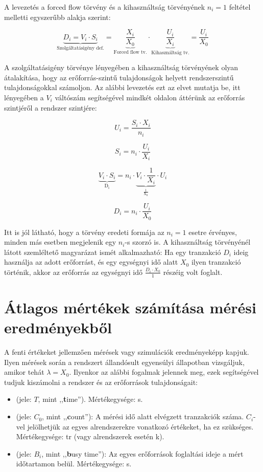 A levezetés a forced flow törvény és a kihasználtság törvényének $n_i = 1$ feltétel melletti egyszerűbb alakja szerint:

$$\underbrace{D_i = V_i \cdot S_i}_\textrm{Szolgáltatásigény def.} =
\underbrace{\frac{X_i}{X_0}}_\textrm{Forced flow tv.} \cdot
\underbrace{\frac{U_i}{X_i}}_\textrm{Kihasználtság tv.} = \frac{U_i}{X_0}$$

A szolgáltatásigény törvénye lényegében a kihasználtság törvényének olyan átalakítása, hogy az erőforrás-szintű tulajdonságok helyett rendszerszintű tulajdonságokkal számoljon. Az alábbi levezetés ezt az elvet mutatja be, itt lényegében a $V_i$ váltószám segítségével mindkét oldalon áttérünk az erőforrás szintjéről a rendszer szintjére:

$$U_i = \frac{S_i \cdot X_i}{n_i}$$

$$S_i = n_i \cdot \frac{U_i}{X_i}$$

$$\underbrace{V_i \cdot S_i}_\mathrm{D_i} = n_i \cdot \underbrace{V_i \cdot \frac{1}{X_i}}_\mathrm{\frac{1}{X_0}} \cdot U_i$$

$$D_i = n_i \cdot \frac{U_i}{X_0}$$

Itt is jól látható, hogy a törvény eredeti formája az $n_i = 1$ esetre érvényes, minden más esetben megjelenik egy $n_i$-s szorzó is. A kihasználtság törvényénél látott szemléltető magyarázat ismét alkalmazható: Ha egy tranzakció $D_i$ ideig használja az adott erőforrást, és egy egységnyi idő alatt $X_0$ ilyen tranzakció történik, akkor az erőforrás az egységnyi idő $\frac{D_i \cdot X_0}{1}$ részéig volt foglalt.

\section{Átlagos mértékek számítása mérési eredményekből }

A fenti értékeket jellemzően mérések vagy szimulációk eredményeképp kapjuk. Ilyen mérések során a rendszert állandósult egyensúlyi állapotban vizsgáljuk, amikor tehát $\lambda = X_0$. Ilyenkor az alábbi fogalmak jelennek meg, ezek segítségével tudjuk kiszámolni a rendszer és az erőforrások tulajdonságait:

\begin{definicio}
\begin{itemize}
	\item {} (jele: $T$, mint ,,\textbf{t}ime''). Mértékegysége: s.
	\item {} (jele: $C_0$, mint ,,\textbf{c}ount''): A mérési idő alatt elvégzett tranzakciók száma. $C_i$-vel jelölhetjük az egyes alrendszerekre vonatkozó értékeket, ha ez szükséges. Mértékegysége: tr (vagy alrendszerek esetén k).
	\item {} (jele: $B_i$, mint ,,\textbf{b}usy time''): Az egyes erőforrások foglaltási ideje a mért időtartamon belül. Mértékegysége: s.
\end{itemize}
\end{definicio}

